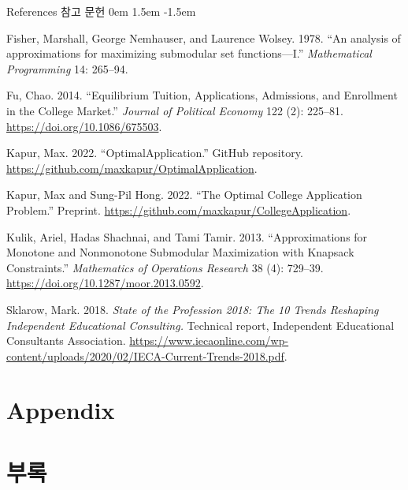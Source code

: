 \documentclass[11pt,slidestop,compress,mathserif,notheorems]{beamer}
\theoremstyle{definition}
\theoremstyle{definition}
\begin{document}
\begin{frame}{\ifen References \else 참고 문헌 \fi}
\small
\parskip 0em
\leftskip 1.5em
\parindent -1.5em


Fisher, Marshall, George Nemhauser, and Laurence Wolsey. 1978. ``An analysis of approximations for maximizing submodular set functions—I.'' \emph{Mathematical Programming} 14: 265--94. 

Fu, Chao. 2014. ``Equilibrium Tuition, Applications, Admissions, and Enrollment in the College Market.'' \emph{Journal of Political Economy} 122 (2): 225--81. \url{https://doi.org/10.1086/675503}. 

Kapur, Max. 2022. ``OptimalApplication.'' GitHub repository. \url{https://github.com/maxkapur/OptimalApplication}.

Kapur, Max and Sung-Pil Hong. 2022. ``The Optimal College Application Problem.'' Preprint. \url{https://github.com/maxkapur/CollegeApplication}.

Kulik, Ariel, Hadas Shachnai, and Tami Tamir. 2013. ``Approximations for Monotone and Nonmonotone Submodular Maximization with Knapsack Constraints.'' \emph{Mathematics of Operations Research} 38 (4): 729--39. \url{https://doi.org/10.1287/moor.2013.0592}.

%

Sklarow, Mark. 2018. \emph{State of the Profession 2018: The 10 Trends Reshaping Independent Educational Consulting.} Technical report, Independent Educational Consultants Association. \url{https://www.iecaonline.com/wp-content/uploads/2020/02/IECA-Current-Trends-2018.pdf}.

\end{frame}








\ifen \section{Appendix} \else \section{부록} \fi
\end{document}
